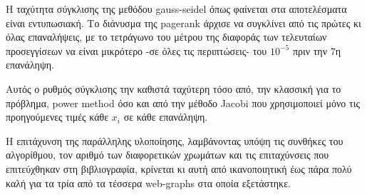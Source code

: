 Η ταχύτητα σύγκλισης της μεθόδου gauss-seidel όπως φαίνεται στα αποτελέσματα είναι εντυπωσιακή. Το διάνυσμα της pagerank άρχισε να συγκλίνει από τις πρώτες κι όλας επαναλήψεις, με το τετράγωνο του μέτρου της διαφοράς των τελευταίων προσεγγίσεων να είναι μικρότερο -σε όλες τις περιπτώσεις- του $10^{-5}$ πριν την 7η επανάληψη. 

Αυτός ο   ρυθμός σύγκλισης την καθιστά ταχύτερη τόσο από, την κλασσική για το πρόβλημα, power method\parencite{silvestrepagerank} όσο και από την μέθοδο Jacobi που χρησιμοποιεί μόνο τις προηγούμενες τιμές κάθε $x_i$ σε κάθε επανάληψη.

Η επιτάχυνση της παράλληλης υλοποίησης, λαμβάνοντας υπόψη τις συνθήκες του αλγορίθμου, τον αριθμό των διαφορετικών χρωμάτων και τις επιταχύνσεις που επιτεύχθηκαν στη βιβλιογραφία\parencite{hasenplaugh2016parallel}, κρίνεται κι αυτή από ικανοποιητική έως πάρα πολύ καλή για τα τρία από τα τέσσερα web-graphs στα οποία εξετάστηκε.